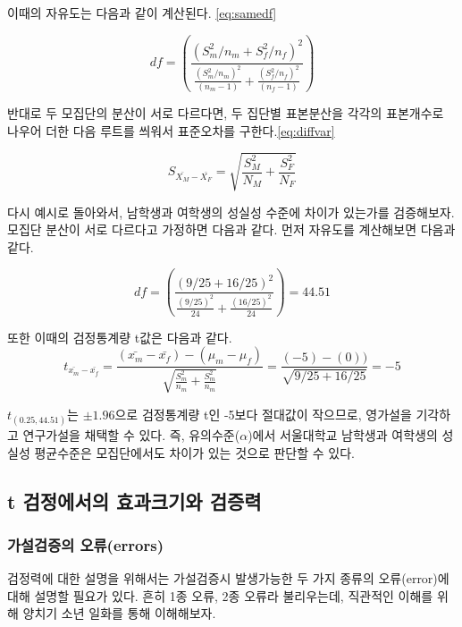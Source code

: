 \documentclass[
]{book}
\begin{document}
이때의 자유도는 다음과 같이 계산된다. \eqref{eq:samedf}

\begin{equation}
df=\left ( \frac{(S^2_{m}/n_{m}+S^2_{f}/n_{f})^2}{\frac{(S^2_{m}/n_{m})^2}{(n_{m}-1)}+\frac{(S^2_{f}/n_{f})^2}{(n_{f}-1)}} \right)
\label{eq:samedf}
\end{equation}

반대로 두 모집단의 분산이 서로 다르다면, 두 집단별 표본분산을 각각의 표본개수로 나우어 더한 다음 루트를 씌워서 표준오차를 구한다.\eqref{eq:diffvar}

\begin{equation}
S_{\bar{X_{M}}-\bar{X_{F}}}= \sqrt{\frac{S^2_{M}}{N_{M}}+\frac{S^2_{F}}{N_{F}}}
\label{eq:diffvar}
\end{equation}

다시 예시로 돌아와서, 남학생과 여학생의 성실성 수준에 차이가 있는가를 검증해보자. 모집단 분산이 서로 다르다고 가정하면 다음과 같다.
먼저 자유도를 계산해보면 다음과 같다.

\begin{equation}
df=\left (\frac{(9/25+16/25)^2}{\frac{(9/25)^2}{24}+\frac{(16/25)^2}{24}}  \right )=44.51
\end{equation}

또한 이때의 검정통계량 t값은 다음과 같다.
\begin{equation}
t_{\bar{x_{m}}-\bar{x_{f}}}=\frac{(\bar{x_{m}}-\bar{x_{f}})-(\mu_{m}-\mu_{f})}{\sqrt{\frac{S_{m}^2}{n_{m}}+\frac{S_{m}^2}{n_{m}}}}=\frac{(-5)-(0))}{\sqrt{9/25+16/25}}=-5
\end{equation}

\(t_{(0.25, 44.51)}\)는 \(\pm1.96\)으로 검정통계량 t인 -5보다 절대값이 작으므로, 영가설을 기각하고 연구가설을 채택할 수 있다. 즉, 유의수준(\(\alpha\))에서 서울대학교 남학생과 여학생의 성실성 평균수준은 모집단에서도 차이가 있는 것으로 판단할 수 있다.

\subsection{t 검정에서의 효과크기와 검증력}\label{t-uxac80uxc815uxc5d0uxc11cuxc758-uxd6a8uxacfcuxd06cuxae30uxc640-uxac80uxc99duxb825}

\subsubsection{가설검증의 오류(errors)}\label{uxac00uxc124uxac80uxc99duxc758-uxc624uxb958errors}

검정력에 대한 설명을 위해서는 가설검증시 발생가능한 두 가지 종류의 오류(error)에 대해 설명할 필요가 있다. 흔히 1종 오류, 2종 오류라 불리우는데, 직관적인 이해를 위해 양치기 소년 일화를 통해 이해해보자.
\end{document}
